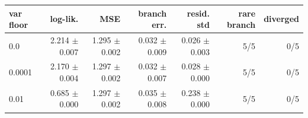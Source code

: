 \begin{tabular}{lrrrrrr}
\toprule
var floor & log-lik. & MSE & branch err. & resid. std & rare branch & diverged \\
\midrule
0.0 & 2.214 $\pm$ 0.007 & 1.295 $\pm$ 0.002 & 0.032 $\pm$ 0.009 & 0.026 $\pm$ 0.003 & 5/5 & 0/5 \\
0.0001 & 2.170 $\pm$ 0.004 & 1.297 $\pm$ 0.002 & 0.032 $\pm$ 0.007 & 0.028 $\pm$ 0.000 & 5/5 & 0/5 \\
0.01 & 0.685 $\pm$ 0.000 & 1.297 $\pm$ 0.002 & 0.035 $\pm$ 0.008 & 0.238 $\pm$ 0.000 & 5/5 & 0/5 \\
\bottomrule
\end{tabular}
